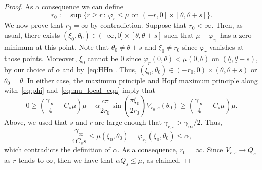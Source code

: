 \documentclass[11pt]{article}    %
\newcommand{\eps}{\varepsilon}
\begin{document}
\begin{proof}
As a consequence we can define 
\begin{equation*}
r_0:= \sup \lbrace r \geq \underline r \, : \, \varphi_r \leq \mu \text{ on }\left(- r , 0\right] \times \left[\underline\theta,\underline\theta + s\right]  \rbrace.
\end{equation*}
We now prove that $r_0 = \infty$ by contradiction. Suppose that $r_0 < \infty$. Then, as usual,
there exists $(\xi_0 , \theta_0) \in (-\infty,0] \times \left[\underline\theta,\underline\theta + s\right]$ such that $\mu - \varphi_{r_0}$ has a zero minimum at this point. Note that $\theta_0\neq \underline\theta + s$ and $\xi_0 \neq r_0$ since $\varphi_r$ vanishes at those points. %
Moreover, $\xi_0$ cannot be $0$ since $\varphi_r(0,\theta) < \mu(0,\theta)$ on $(\underline\theta,\underline\theta+s)$, by our choice of $\alpha$ and by~\eqref{eq:HHn}.  %
Thus, $(\xi_0 , \theta_0) \in (-r_0,0)\times(\underline\theta,\underline\theta+s)$ or $\theta_0 = \underline \theta$.  In either case, the maximum principle and Hopf maximum principle along with~\eqref{eq:phi} and~\eqref{eq:mu_local_eqn} imply that
\begin{equation*}
0
	\geq \left( \frac{\gamma_\infty}{4}- C_s \mu  \right) \mu -  \alpha \frac{c\pi}{2r_0} \sin\left( \frac{\pi \xi_0}{2 r_0}\right) V_{r_0,s}(\theta_0)
	\geq \left( \frac{\gamma_\infty}{4}- C_s \mu  \right) \mu.
\end{equation*}
Above, we used that $s$ and $r$ are large enough that $\gamma_{r,s} > \gamma_\infty/2$.   Thus,
\begin{equation*}
\frac{\gamma_\infty}{4C_s s} \leq \mu(\xi_0,\theta_0) = \varphi_{r_0}(\xi_0,\theta_0) \leq \alpha,
\end{equation*}
which contradicts the definition of $\alpha$.
As a consequence, $r_0 = \infty$.  Since $V_{r,s} \to Q_s$ as $r$ tends to $\infty$, then we have that $\alpha Q_s \leq \mu$, as claimed.


\end{proof}
\end{document}
